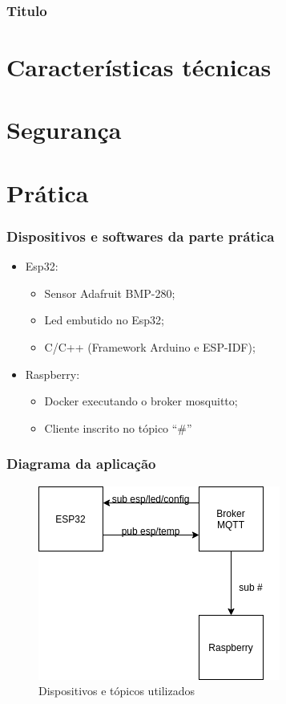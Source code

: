 \documentclass[12pt]{beamer}
\begin{document}
\begin{frame}
    \frametitle{Titulo}
\end{frame}

\section{Características técnicas}\label{Características técnicas}

\section{Segurança}\label{Segurança}

\section{Prática}\label{Prática}
\begin{frame}
    \frametitle{Dispositivos e softwares da parte prática}
    \begin{itemize}
        \item Esp32:
            \begin{itemize}
                \item Sensor Adafruit BMP-280;
                \item Led embutido no Esp32;
                \item C/C++ (Framework Arduino e ESP-IDF);
            \end{itemize}
        \item Raspberry:
            \begin{itemize}
                \item Docker executando o broker mosquitto;
                \item Cliente inscrito no tópico ``\#''
            \end{itemize}
    \end{itemize}
\end{frame}

\begin{frame}
    \frametitle{Diagrama da aplicação}
    \begin{figure}[!htb]
        \centering
        \includegraphics[width=.7\textwidth]{aplication}
        \caption{\label{fig:aplication} Dispositivos e tópicos utilizados}
    \end{figure}
\end{frame}
\end{document}
